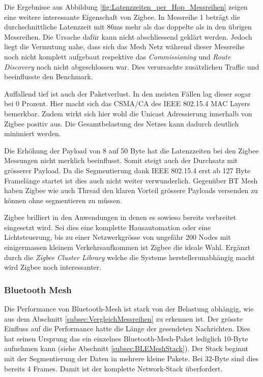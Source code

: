 Die Ergebnisse aus Abbildung \ref{fig:Latenzzeiten_per_Hop_Messreihen} zeigen eine weitere interessante Eigenschaft von Zigbee.
In Messreihe 1 beträgt die durchschnittliche Latenzzeit mit 86ms mehr als das doppelte als in den übrigen Messreihen.
Die Ursache dafür kann nicht abschliessend geklärt werden.
Jedoch liegt die Vermutung nahe, dass sich das Mesh Netz während dieser Messreihe noch nicht komplett aufgebaut respektive das \textit{Commissioning} und \textit{Route Discovery} noch nicht abgeschlossen war.
Dies verursachte zusätzlichen Traffic und beeinflusste den Benchmark.

Auffallend tief ist auch der Paketverlust.
In den meisten Fällen lag dieser sogar bei 0 Prozent.
Hier macht sich das CSMA\slash CA des IEEE 802.15.4 MAC Layers bemerkbar.
Zudem wirkt sich hier wohl die Unicast Adressierung innerhalb von Zigbee positiv aus.
Die Gesamtbelastung des Netzes kann dadurch deutlich minimiert werden.

Die Erhöhung der Payload von 8 auf 50 Byte hat die Latenzzeiten bei den Zigbee Messungen nicht merklich beeinflusst.
Somit steigt auch der Durchsatz mit grösserer Payload.
Da die Segmentierung dank IEEE 802.15.4 erst ab 127 Byte Framelänge startet ist dies auch nicht weiter verwunderlich.
Gegenüber BT Mesh haben Zigbee wie auch Thread den klaren Vorteil grössere Payloads versenden zu können ohne segmentieren zu müssen.

Zigbee brilliert in den Anwendungen in denen es sowieso bereits verbreitet eingesetzt wird.
Sei dies eine komplette Hausautomation oder eine Lichtsteuerung, bis zu einer Netzwerkgrösse von ungefähr 200 Nodes mit einigermassen kleinem Verkehrsaufkommen ist Zigbee die ideale Wahl.
Ergänzt durch die \textit{Zigbee Cluster Library} welche die Systeme herstellerunabhängig macht wird Zigbee noch interessanter.


\subsubsection{Bluetooth Mesh}\label{subsubsec:FazitBluetoothMesh}
Die Performance von Bluetooth-Mesh ist stark von der Belastung abhängig, wie aus dem Abschnitt \ref{subsec:VergleichMessreihen} zu erkennen ist. Der grösste Einfluss auf die Performance hatte die Länge der gesendeten Nachrichten. Dies hat seinen Ursprung das ein einzelnes Bluetooth-Mesh-Paket lediglich 10-Byte aufnehmen kann (siehe Abschnitt \ref{subsec:BLEMeshStack}). Der Stack beginnt mit der Segmentierung der Daten in mehrere kleine Pakete. Bei 32-Byte sind dies bereits 4 Frames. Damit ist der komplette Network-Stack überfordert. 

